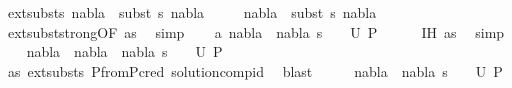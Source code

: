 \begin{isabellebody}
\ ext{\isacharunderscore}{\kern0pt}substs{\isacharcolon}{\kern0pt}\ {\isachardoublequoteopen}nabla{}\ {\isasymTurnstile}\ {\isacharparenleft}{\kern0pt}subst\ s{}{\isacharparenright}{\kern0pt}\ {\isacharparenleft}{\kern0pt}nabla{}{\isacharparenright}{\kern0pt}{\isachardoublequoteclose}\ \isanewline
\ \ \ \ {\isachardoublequoteopen}nabla{}\ {\isasymTurnstile}\ {\isacharparenleft}{\kern0pt}subst\ s{}{\isacharparenright}{\kern0pt}\ nabla{\isachardoublequoteclose}\isanewline
\ \ \ \ \isamarkupfalse%
\ ext{\isacharunderscore}{\kern0pt}subst{\isacharunderscore}{\kern0pt}strong{\isacharbrackleft}{\kern0pt}OF\ as{\isacharparenleft}{\kern0pt}{}{\isacharparenright}{\kern0pt}{\isacharbrackright}{\kern0pt}\ \isamarkupfalse%
\ simp{\isacharplus}{\kern0pt}\isanewline
\ \ \isamarkupfalse%
\ a{\isacharcolon}{\kern0pt}\ {\isachardoublequoteopen}{\isacharparenleft}{\kern0pt}nabla{}\ {\isasymunion}\ nabla{}{\isacharcomma}{\kern0pt}\ s{}\ {\isasymbullet}\ {\isacharbrackleft}{\kern0pt}{\isacharbrackright}{\kern0pt}{\isacharparenright}{\kern0pt}\ {\isasymin}\ U\ P{}{\isachardoublequoteclose}\isanewline
\ \ \ \ \isamarkupfalse%
\ IH\ as{\isacharparenleft}{\kern0pt}{}{\isacharparenright}{\kern0pt}\ \isamarkupfalse%
\ simp\isanewline
\ \ \isamarkupfalse%
\ {\isachardoublequoteopen}{\isacharparenleft}{\kern0pt}nabla{}\ {\isasymunion}\ nabla{}\ {\isasymunion}\ nabla{}{\isacharcomma}{\kern0pt}\ s{}\ {\isasymbullet}\ {\isacharbrackleft}{\kern0pt}{\isacharbrackright}{\kern0pt}{\isacharparenright}{\kern0pt}\ {\isasymin}\ U\ P{}{\isachardoublequoteclose}\isanewline
\ \ \ \ \isamarkupfalse%
\ as{\isacharparenleft}{\kern0pt}{}{\isacharparenright}{\kern0pt}\ ext{\isacharunderscore}{\kern0pt}substs{\isacharparenleft}{\kern0pt}{}{\isacharparenright}{\kern0pt}\ P{}{\isacharunderscore}{\kern0pt}from{\isacharunderscore}{\kern0pt}P{}{\isacharunderscore}{\kern0pt}cred\ solution{\isacharunderscore}{\kern0pt}comp{\isacharunderscore}{\kern0pt}id\ \isamarkupfalse%
\ blast\isanewline
\ \ \isamarkupfalse%
\ \isamarkupfalse%
\ {\isachardoublequoteopen}{\isacharparenleft}{\kern0pt}nabla{}\ {\isasymunion}\ nabla{}{\isacharcomma}{\kern0pt}\ s{}\ {\isasymbullet}\ {\isacharbrackleft}{\kern0pt}{\isacharbrackright}{\kern0pt}{\isacharparenright}{\kern0pt}\ {\isasymin}\ U\ P{}{\isachardoublequoteclose}\isanewline

\end{isabellebody}
